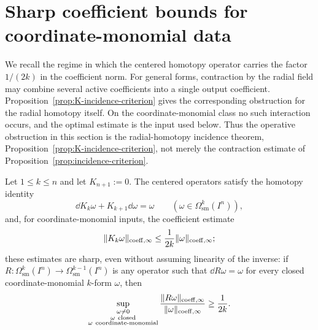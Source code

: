 \section{Sharp coefficient bounds for coordinate-monomial data}

We recall the regime in which the centered homotopy operator carries the
factor $1/(2k)$ in the coefficient norm. For general forms, contraction by the
radial field may combine several active coefficients into a single output
coefficient. Proposition~\ref{prop:K-incidence-criterion} gives the
corresponding obstruction for the radial homotopy itself. On the
coordinate-monomial class no such interaction occurs, and the optimal estimate
is the input used below. Thus the operative obstruction in this section is the
radial-homotopy incidence theorem, Proposition~\ref{prop:K-incidence-criterion},
not merely the contraction estimate of Proposition~\ref{prop:incidence-criterion}.

\begin{theorem}
\label{thm:optimal-continuous-inverse}
Let $1\le k\le n$ and let $K_{n+1}:=0$. The centered operators satisfy the
homotopy identity
\[
\dd K_k\omega+K_{k+1}\dd\omega=\omega
\qquad
(\omega\in\Omega^k_{\mathrm{sm}}(I^n)),
\]
and, for coordinate-monomial inputs, the coefficient estimate
\[
\lVert K_k\omega \rVert_{\mathrm{coeff},\infty}
\le
\frac1{2k}\lVert \omega \rVert_{\mathrm{coeff},\infty};
\]
these estimates are sharp, even without assuming linearity of the inverse: if
$R:\Omega^k_{\mathrm{sm}}(I^n)\to\Omega^{k-1}_{\mathrm{sm}}(I^n)$ is any
operator such that $\dd R\omega=\omega$ for every closed coordinate-monomial
$k$-form $\omega$, then
\[
\sup_{\substack{\omega\ne0\\ \omega\ \mathrm{closed}\\ \omega\ \mathrm{coordinate\text{-}monomial}}}
\frac{\norm{R\omega}_{\coeff,\infty}}{\norm{\omega}_{\coeff,\infty}}
\ge
\frac1{2k}.
\]
\end{theorem}

